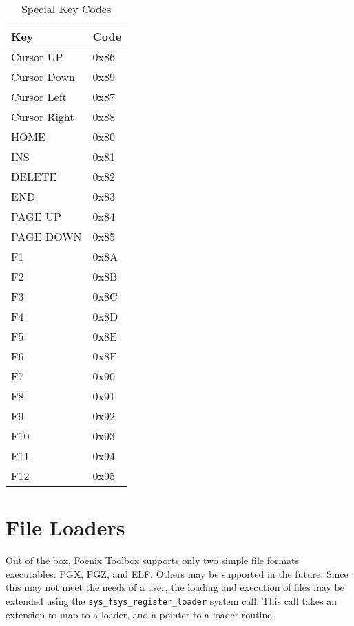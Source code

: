 \begin{table}[h]
    \begin{center}
        \begin{tabular}{|l|l|} \hline
            Key & Code \\ \hline\hline
            Cursor UP & 0x86 \\ \hline
            Cursor Down & 0x89 \\ \hline
            Cursor Left & 0x87 \\ \hline
            Cursor Right & 0x88 \\ \hline
            HOME & 0x80 \\ \hline
            INS & 0x81 \\ \hline
            DELETE & 0x82 \\ \hline
            END & 0x83 \\ \hline
            PAGE UP & 0x84 \\ \hline
            PAGE DOWN & 0x85 \\ \hline
            F1 & 0x8A \\ \hline
            F2 & 0x8B \\ \hline
            F3 & 0x8C \\ \hline
            F4 & 0x8D \\ \hline
            F5 & 0x8E \\ \hline
            F6 & 0x8F \\ \hline
            F7 & 0x90 \\ \hline
            F8 & 0x91 \\ \hline
            F9 & 0x92 \\ \hline
            F10 & 0x93 \\ \hline
            F11 & 0x94 \\ \hline
            F12 & 0x95 \\ \hline
        \end{tabular}
    \end{center}
    \caption{Special Key Codes}
    \label{tbl:special_key_codes}
\end{table}

\section{File Loaders}
Out of the box, Foenix Toolbox supports only two simple file formats executables: PGX, PGZ, and ELF. Others may be supported in the future.
Since this may not meet the needs of a user, the loading and execution of files may be extended using the \verb+sys_fsys_register_loader+ system call.
This call takes an extension to map to a loader, and a pointer to a loader routine.

